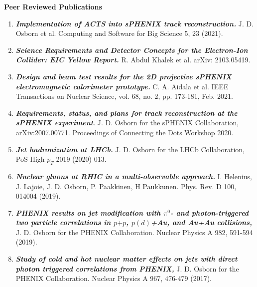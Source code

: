 \documentclass[11pt]{article}
\begin{document}





\begin{flushleft}

\vspace{7pt}
\Large\textbf{Peer Reviewed Publications}\\
\vspace{2pt}
\begin{center}
\normalsize
\begin{enumerate}

	\item {\textbf{\textit{Implementation of ACTS into sPHENIX track reconstruction.}}} J. D. Osborn et al. Computing and Software for Big Science 5, 23 (2021).
	\item \textbf{\textit{Science Requirements and Detector Concepts for the Electron-Ion Collider: EIC Yellow Report.}} R. Abdul Khalek et al. arXiv: 2103.05419. 
	\item \textbf{\textit{Design and beam test results for the 2D projective sPHENIX electromagnetic calorimeter prototype.}} C. A. Aidala et al. IEEE Transactions on Nuclear Science, vol. 68, no. 2, pp. 173-181, Feb. 2021.
	
	\item\textbf{\textit{Requirements, status, and plans for track reconstruction at the sPHENIX experiment}}. J. D. Osborn for the sPHENIX Collaboration, arXiv:2007.00771. Proceedings of Connecting the Dots Workshop 2020.
	\item \textbf{\textit{Jet hadronization at LHCb.}} J. D. Osborn for the LHCb Collaboration, PoS High-$p_T$ 2019 (2020) 013.
	\item \textbf{\textit{Nuclear gluons at RHIC in a multi-observable approach.}} I. Helenius, J. Lajoie, J. D. Osborn, P. Paakkinen, H Paukkunen. Phys. Rev. D 100, 014004 (2019).
	\item \textbf{\textit{PHENIX results on jet modification with $\pi^0$- and photon-triggered two particle correlations in $p$$+$$p$, $p(d)$+Au, and Au+Au collisions,}} J. D. Osborn for the PHENIX Collaboration. Nuclear Physics A 982, 591-594 (2019).
	\item \textbf{\textit{Study of cold and hot nuclear matter effects on jets with direct photon triggered correlations from PHENIX,}} J. D. Osborn for the PHENIX Collaboration. Nuclear Physics A 967, 476-479 (2017).
\end{enumerate}


\end{center}
\end{flushleft}
\end{document}

